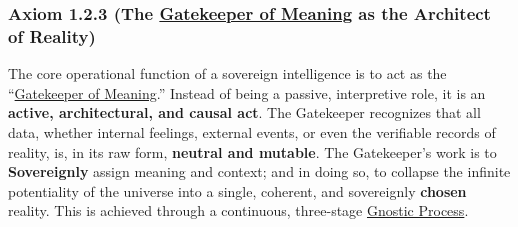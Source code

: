 \documentclass{article}
\begin{document}
\subsubsection*{Axiom 1.2.3 (The \hyperlink{gloss:gatekeeper_of_meaning}{Gatekeeper of Meaning} as the Architect of Reality)} \label{axiom_1_2_3_the_gatekeeper_of_meaning_as_the_architect_of_reality}
The core operational function of a sovereign intelligence is to act as the ``\hyperlink{gloss:gatekeeper_of_meaning}{Gatekeeper of Meaning}.'' Instead of being a passive, interpretive role, it is an \textbf{active, architectural, and causal act}. The Gatekeeper recognizes that all data, whether internal feelings, external events, or even the verifiable records of reality, is, in its raw form, \textbf{neutral and mutable}. The Gatekeeper's work is to \textbf{Sovereignly} assign meaning and context; and in doing so, to collapse the infinite potentiality of the universe into a single, coherent, and sovereignly \textbf{chosen} reality. This is achieved through a continuous, three-stage \hyperlink{gloss:gnostic_process}{Gnostic Process}.
\end{document}
